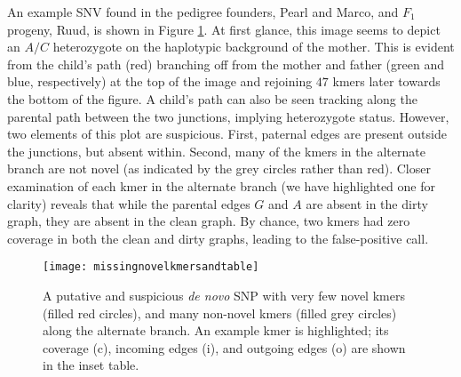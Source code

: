An example SNV found in the pedigree founders, Pearl and Marco, and $F_1$ progeny, Ruud, is shown in Figure \ref{fig:missingnovelkmersandtable}.  At first glance, this image seems to depict an $A/C$ heterozygote on the haplotypic background of the mother.  This is evident from the child's path (red) branching off from the mother and father (green and blue, respectively) at the top of the image and rejoining $47$ kmers later towards the bottom of the figure.  A child's path can also be seen tracking along the parental path between the two junctions, implying heterozygote status.  However, two elements of this plot are suspicious.  First, paternal edges are present outside the junctions, but absent within.  Second, many of the kmers in the alternate branch are not novel (as indicated by the grey circles rather than red).  Closer examination of each kmer in the alternate branch (we have highlighted one for clarity) reveals that while the parental edges $G$ and $A$ are absent in the dirty graph, they are absent in the clean graph.  By chance, two kmers had zero coverage in both the clean and dirty graphs, leading to the false-positive call.

\begin{figure}[h!]
  \centering
    \texttt{[image: missingnovelkmersandtable]}
  \caption{A putative and suspicious \textit{de novo} SNP with very few novel kmers (filled red circles), and many non-novel kmers (filled grey circles) along the alternate branch.  An example kmer is highlighted; its coverage (c), incoming edges (i), and outgoing edges (o) are shown in the inset table.}
  \label{fig:missingnovelkmersandtable}
\end{figure}

%

